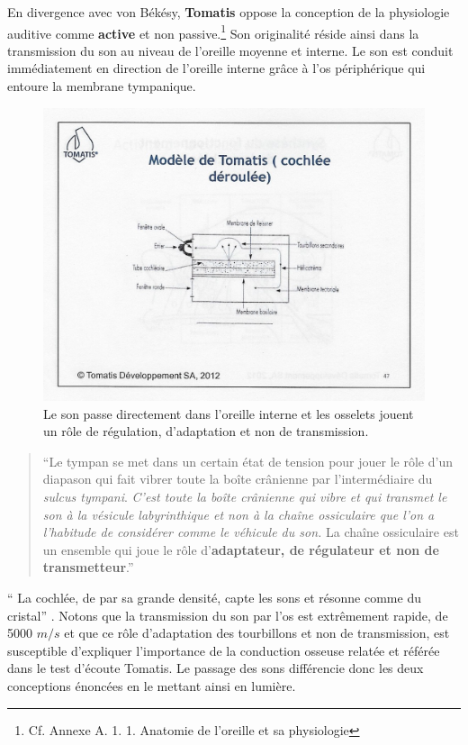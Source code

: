 En divergence avec von Békésy, \textbf{Tomatis} oppose la conception de la
physiologie auditive comme \textbf{active} et non
passive.\footnote{Cf. Annexe A. 1. 1. Anatomie de l'oreille et sa physiologie}
Son originalité réside ainsi dans la transmission du son
au niveau de l'oreille moyenne et interne. Le son est conduit immédiatement en direction de l'oreille 
interne grâce à l'os périphérique qui entoure la membrane tympanique.
\begin{figure}
	\centering
	\includegraphics[width=1.0\linewidth]{images/Cochleederoule_haut.jpg}
	\caption[Cochlée selon Tomatis]{Le son passe directement  
		dans l'oreille interne et les osselets jouent un rôle de régulation, d'adaptation et non de 
		transmission.}
	\label{fig:cochleederoulehaut}
\end{figure}
\begin{quotation}
	``Le tympan se met dans un certain état de tension pour jouer le
	rôle d'un diapason qui fait vibrer toute la boîte crânienne
	par l'intermédiaire du \emph{sulcus tympani}.
	\emph{C'est toute la boîte crânienne qui vibre et qui transmet le son à
		la vésicule labyrinthique et non à la chaîne ossiculaire que l'on a l'habitude
		de considérer comme le véhicule du son.} La chaîne ossiculaire est un ensemble
	qui
	joue le rôle d'\textbf{adaptateur, de régulateur et non de transmetteur}.'' \autocite {tomatis_conf1972}

\end{quotation}
\enquote {	La cochlée, de par sa grande densité, capte les sons
	et résonne comme du cristal}  \autocite {tomatis_conf1972}.
Notons que la transmission du son par l'os est extrêmement rapide, de
5000 $m/s$ et que ce rôle d'adaptation des tourbillons et non de transmission, 
est susceptible d'expliquer l'importance de  
la conduction osseuse relatée et référée dans le  test d'écoute Tomatis.
Le passage des sons différencie donc les deux conceptions énoncées 
en le mettant ainsi en lumière. 

